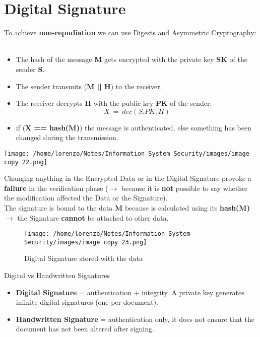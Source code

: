 \section{Digital Signature}
To achieve \textbf{non-repudiation} we can use Digests and Asymmetric Cryptography:
\\
\\
\begin{minipage}{0.6\textwidth}
\begin{itemize}
    \item The hash of the message \textbf{M} gets encrypted with the private key \textbf{SK} of the sender \textbf{S}.
    \item The sender transmits (\textbf{M || H}) to the receiver.
    \item The receiver decrypts \textbf{H} with the public key \textbf{PK} of the sender:
    \[
    X\ =\ dec(S.PK,H)
    \]
    \item if (\textbf{X == hash(M)}) the message is authenticated, else something has been changed during the transmission.
\end{itemize}
\end{minipage} 
\hspace{0.3cm}
\begin{minipage}{0.4\textwidth}
    \centering
    \texttt{[image: /home/lorenzo/Notes/Information System Security/images/image copy 22.png]}
\end{minipage}
\newpage
\noindent
Changing anything in the Encrypted Data or in the Digital Signature provoke a \textbf{failure} in the verification phase (\(\rightarrow \) because it is \textbf{not} possible to say whether the modification affected the Data or
the Signature).\\
The signature is bound to the data \textbf{M} because is calculated using its \textbf{hash(M)} \(\rightarrow \) the Signature \textbf{cannot} be attached to other data.
\begin{figure}[H]
    \centering
    \texttt{[image: /home/lorenzo/Notes/Information System Security/images/image copy 23.png]}
    \caption{Digital Signature stored with the data}
\end{figure}
\begin{center}
    \begin{quotebox-grey}{Digital vs Handwritten Signatures}
        \begin{itemize}
            \item \textbf{Digital Signature} = authentication + integrity. A private key generates infinite digital signatures (one per document).
            \item \textbf{Handwritten Signature} = authentication only, it does not ensure that the document has not been altered after signing.
        \end{itemize}
    \end{quotebox-grey}   
\end{center}

